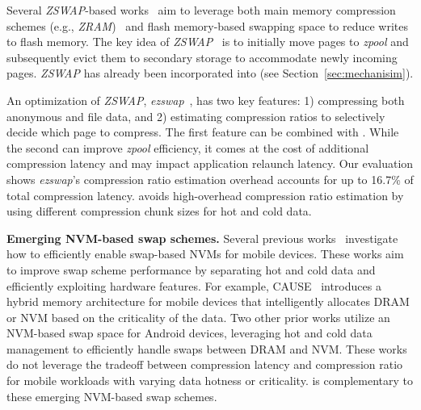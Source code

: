 Several \emph{ZSWAP}-based works~\cite{zswap, han, kim2019ezswap} aim to leverage both main memory compression schemes (e.g., \emph{ZRAM})~\cite{zram1, zram2, new-zram, merge-zram} and flash memory-based swapping space to reduce writes to flash memory. The key idea of \emph{ZSWAP}~\cite{zswap, han, kim2019ezswap} is to initially move pages to \emph{zpool} and subsequently evict them to secondary storage to accommodate newly incoming pages. 
\emph{ZSWAP} has already been incorporated into \proposal (see Section~\ref{sec:mechanisim}).

An optimization of \emph{ZSWAP}, \emph{ezswap}~\cite{kim2019ezswap}, has two key features: 1) compressing both anonymous and file data, and 2) estimating compression ratios to selectively decide which page to compress. The first feature can be combined with \proposal. While the second can improve  \emph{zpool} efficiency, it comes at the cost of additional compression latency and may impact application relaunch latency. Our evaluation shows \emph{ezswap}'s compression ratio estimation overhead accounts for up to 16.7\% of total compression latency. 
\proposal avoids high-overhead compression ratio estimation by using different compression chunk sizes for hot and cold data.

\noindent\textbf{Emerging NVM-based swap schemes.}  
Several previous works~\cite{zhong2014building, kim2015cause, zhong2017building,kim2018comparison, zhu2017smartswap, liu2017non, oliveira2021extending, oliveira2021extending1} investigate how to efficiently enable swap-based NVMs for mobile devices. These works aim to improve swap scheme performance by separating hot and cold data and efficiently exploiting hardware features. For example, CAUSE~\cite{kim2015cause} introduces a hybrid memory architecture for mobile devices that intelligently allocates DRAM or NVM based on the criticality of the data. Two other prior works\cite{kim2018comparison, zhong2017building} utilize an NVM-based swap space for Android devices, leveraging hot and cold data management to efficiently handle swaps between DRAM and NVM. These works do not leverage the tradeoff between compression latency and compression ratio for mobile workloads with varying data hotness or criticality.  \proposal is complementary to these emerging NVM-based swap schemes.


